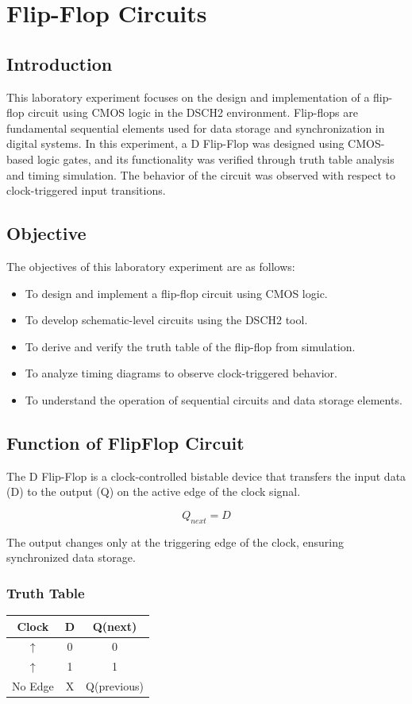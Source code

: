 \documentclass[12pt,a4paper]{report}
\begin{document}
\chapter{Flip-Flop Circuits}
\section*{Introduction}
This laboratory experiment focuses on the design and implementation of a flip-flop circuit using CMOS logic in the DSCH2 environment. Flip-flops are fundamental sequential elements used for data storage and synchronization in digital systems. In this experiment, a D Flip-Flop was designed using CMOS-based logic gates, and its functionality was verified through truth table analysis and timing simulation. The behavior of the circuit was observed with respect to clock-triggered input transitions.

\section*{Objective}
The objectives of this laboratory experiment are as follows:
\begin{itemize}
    \item To design and implement a flip-flop circuit using CMOS logic.
    \item To develop schematic-level circuits using the DSCH2 tool.
    \item To derive and verify the truth table of the flip-flop from simulation.
    \item To analyze timing diagrams to observe clock-triggered behavior.
    \item To understand the operation of sequential circuits and data storage elements.
\end{itemize}

\section{Function of FlipFlop Circuit}
The D Flip-Flop is a clock-controlled bistable device that transfers the input data (D) to the output (Q) on the active edge of the clock signal.

\[
Q_{next} = D
\]

The output changes only at the triggering edge of the clock, ensuring synchronized data storage.


\subsection*{Truth Table}
\begin{center}
\begin{tabular}{|c|c|c|}
\hline
Clock & D & Q(next) \\ \hline
$\uparrow$ & 0 & 0 \\
$\uparrow$ & 1 & 1 \\
No Edge & X & Q(previous) \\ \hline
\end{tabular}
\end{center}
\end{document}
